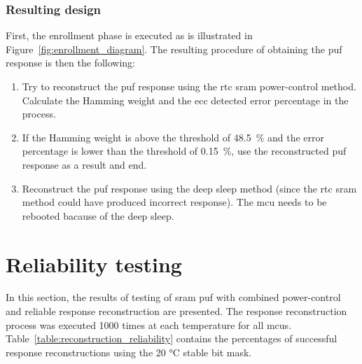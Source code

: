 \subsubsection*{Resulting design}

First, the enrollment phase is executed as is illustrated in Figure~\ref{fig:enrollment_diagram}. The resulting procedure of obtaining the \gls{puf} response is then the following:
\begin{enumerate}
    \item Try to reconstruct the \gls{puf} response using the \gls{rtc} \gls{sram} power-control method. Calculate the Hamming weight and the \gls{ecc} detected error percentage in the process.
    \item If the Hamming weight is above the threshold of 48.5~\% and the error percentage is lower than the threshold of 0.15~\%, use the reconstructed \gls{puf} response as a result and end.
    \item Reconstruct the \gls{puf} response using the deep sleep method (since the \gls{rtc} \gls{sram} method could have produced incorrect response). The \gls{mcu} needs to be rebooted bacause of the deep sleep.
\end{enumerate}

\section{Reliability testing}\label{sec:testing}

In this section, the results of testing of \gls{sram} \gls{puf} with combined power-control and reliable response reconstruction are presented. The response reconstruction process was executed 1000 times at each temperature for all \glspl{mcu}. Table~\ref{table:reconstruction_reliability} contains the percentages of successful response reconstructions using the 20 °C stable bit mask.

